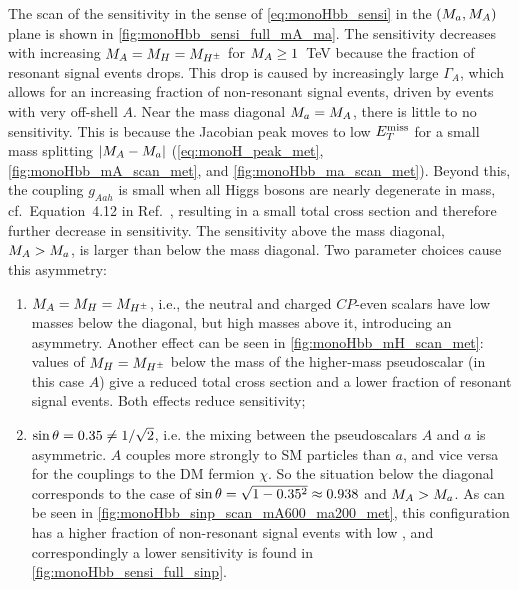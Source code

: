 The scan of the sensitivity in the sense of \autoref{eq:monoHbb_sensi} in the $(M_{a},M_{A})$ plane is shown in \autoref{fig:monoHbb_sensi_full_mA_ma}.
The sensitivity decreases with increasing $M_{A} = M_{H} = M_{H^{\pm}}$ for $M_{A} \geq 1$~TeV because the fraction of resonant signal events drops. 
This drop is caused by increasingly large $\Gamma_A$, 
which allows for an increasing fraction of non-resonant signal events, driven by events with very off-shell $A$. %
Near the mass diagonal $M_{a} = M_{A}$, there is little to no sensitivity. 
This is because the Jacobian peak moves to low $E_T^\mathrm{miss}$ for a small mass splitting $|M_{A} - M_{a}|$
(\autoref{eq:monoH_peak_met}, \autoref{fig:monoHbb_mA_scan_met}, and \autoref{fig:monoHbb_ma_scan_met}).
Beyond this, the coupling $g_{Aah}$ is small when all Higgs bosons are nearly degenerate in mass, cf.~Equation~4.12 in Ref.~\cite{Bauer:2017ota}, %
resulting in a small total cross section and therefore further decrease in sensitivity.
The sensitivity above the mass diagonal, $M_{A} > M_{a}$, is larger than below the mass diagonal.
Two parameter choices cause this asymmetry:
\begin{enumerate}
\item 
$M_{A} = M_{H} = M_{H^{\pm}}$, i.e., the neutral and charged $CP$-even scalars have low masses below the diagonal, but high masses above it, introducing an asymmetry.
Another effect can be seen in \autoref{fig:monoHbb_mH_scan_met}: values of  $M_{H} = M_{H^{\pm}}$ below the mass of the higher-mass pseudoscalar (in this case $A$)
give a reduced total cross section and a lower fraction of resonant signal events. Both effects reduce sensitivity;
\item 
$\sin\theta = 0.35 \neq 1/\sqrt{2}$, i.e. the mixing between the pseudoscalars $A$ and $a$ is asymmetric. 
$A$ couples more strongly to SM particles than $a$, and vice versa for the couplings to the DM fermion $\chi$.
So the situation below the diagonal corresponds to the case of $\sin\theta = \sqrt{1-0.35^2} \approx 0.938$ and $M_{A} > M_{a}$. 
As can be seen in \autoref{fig:monoHbb_sinp_scan_mA600_ma200_met},
this \sinp configuration has a higher fraction of non-resonant signal events with low \met, and correspondingly a lower sensitivity is found in \autoref{fig:monoHbb_sensi_full_sinp}.
\end{enumerate}

